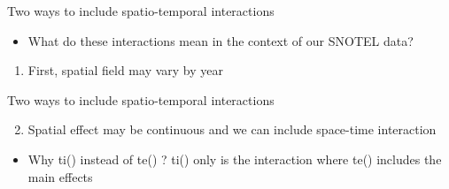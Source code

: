 \documentclass[
  ignorenonframetext,
]{beamer}
\newenvironment{Shaded}{\begin{snugshade}}{\end{snugshade}}
\newcommand{\DataTypeTok}[1]{\textcolor[rgb]{0.13,0.29,0.53}{#1}}
\newcommand{\DecValTok}[1]{\textcolor[rgb]{0.00,0.00,0.81}{#1}}
\newcommand{\KeywordTok}[1]{\textcolor[rgb]{0.13,0.29,0.53}{\textbf{#1}}}
\newcommand{\NormalTok}[1]{#1}
\newcommand{\OperatorTok}[1]{\textcolor[rgb]{0.81,0.36,0.00}{\textbf{#1}}}
\newcommand{\StringTok}[1]{\textcolor[rgb]{0.31,0.60,0.02}{#1}}
\providecommand{\tightlist}{%
  \setlength{\itemsep}{0pt}\setlength{\parskip}{0pt}}
\begin{document}
\begin{frame}[fragile]{Two ways to include spatio-temporal interactions}
\protect\hypertarget{two-ways-to-include-spatio-temporal-interactions}{}

\begin{itemize}
\tightlist
\item
  What do these interactions mean in the context of our SNOTEL data?
\end{itemize}

\begin{enumerate}
\tightlist
\item
  First, spatial field may vary by year
\end{enumerate}

\begin{Shaded}
\end{Shaded}

\end{frame}

\begin{frame}[fragile]{Two ways to include spatio-temporal interactions}
\protect\hypertarget{two-ways-to-include-spatio-temporal-interactions-1}{}

\begin{enumerate}
\setcounter{enumi}{1}
\tightlist
\item
  Spatial effect may be continuous and we can include space-time
  interaction
\end{enumerate}

\begin{itemize}
\tightlist
\item
  Why ti() instead of te() ? ti() only is the interaction where te()
  includes the main effects
\end{itemize}

\begin{Shaded}
\end{Shaded}

\end{frame}
\end{document}
